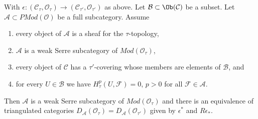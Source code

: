 \begin{lemma}
\label{lemma-compare-topologies-derived-adequate-modules}
With $\epsilon :
(\mathcal{C}_\tau, \mathcal{O}_\tau)
\longrightarrow
(\mathcal{C}_{\tau'}, \mathcal{O}_{\tau'})$
as above. Let $\mathcal{B} \subset \Ob(\mathcal{C})$ be a subset.
Let $\mathcal{A} \subset \textit{PMod}(\mathcal{O})$
be a full subcategory. Assume
\begin{enumerate}
\item every object of $\mathcal{A}$ is a sheaf for the $\tau$-topology,
\item $\mathcal{A}$ is a weak Serre subcategory of
$\textit{Mod}(\mathcal{O}_\tau)$,
\item every object of $\mathcal{C}$ has a $\tau'$-covering whose
members are elements of $\mathcal{B}$, and
\item for every $U \in \mathcal{B}$ we have $H^p_\tau(U, \mathcal{F}) = 0$,
$p > 0$ for all $\mathcal{F} \in \mathcal{A}$.
\end{enumerate}
Then $\mathcal{A}$ is a weak Serre subcategory of
$\textit{Mod}(\mathcal{O}_\tau)$ and there is an equivalence
of triangulated categories
$D_\mathcal{A}(\mathcal{O}_\tau) = D_\mathcal{A}(\mathcal{O}_{\tau'})$
given by $\epsilon^*$ and $R\epsilon_*$.
\end{lemma}

